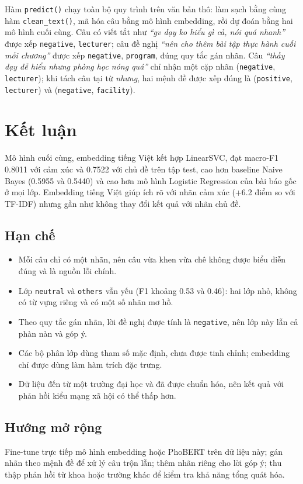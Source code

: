 Hàm \texttt{predict()} chạy toàn bộ quy trình trên văn bản thô: làm sạch bằng cùng hàm \texttt{clean\_text()}, mã hóa câu
bằng mô hình embedding, rồi dự đoán bằng hai mô hình cuối cùng. Câu có viết tắt như \textit{``gv dạy ko hiểu gì cả, nói
quá nhanh''} được xếp \texttt{negative}, \texttt{lecturer}; câu đề nghị \textit{``nên cho thêm bài tập thực hành cuối mỗi
chương''} được xếp \texttt{negative}, \texttt{program}, đúng quy tắc gán nhãn. Câu \textit{``thầy dạy dễ hiểu nhưng phòng
học nóng quá''} chỉ nhận một cặp nhãn (\texttt{negative}, \texttt{lecturer}); khi tách câu tại từ \textit{nhưng}, hai
mệnh đề được xếp đúng là (\texttt{positive}, \texttt{lecturer}) và (\texttt{negative}, \texttt{facility}).

\section{Kết luận}

Mô hình cuối cùng, embedding tiếng Việt kết hợp LinearSVC, đạt macro-F1 0.8011 với cảm xúc và 0.7522 với chủ đề trên tập
test, cao hơn baseline Naive Bayes (0.5955 và 0.5440) và cao hơn mô hình Logistic Regression của bài báo gốc ở mọi lớp.
Embedding tiếng Việt giúp ích rõ với nhãn cảm xúc (+6.2 điểm so với TF-IDF) nhưng gần như không thay đổi kết quả với nhãn
chủ đề.

\subsection*{Hạn chế}
\begin{itemize}
  \item Mỗi câu chỉ có một nhãn, nên câu vừa khen vừa chê không được biểu diễn đúng và là nguồn lỗi chính.
  \item Lớp \texttt{neutral} và \texttt{others} vẫn yếu (F1 khoảng 0.53 và 0.46): hai lớp nhỏ, không có từ vựng riêng và
        có một số nhãn mơ hồ.
  \item Theo quy tắc gán nhãn, lời đề nghị được tính là \texttt{negative}, nên lớp này lẫn cả phàn nàn và góp ý.
  \item Các bộ phân lớp dùng tham số mặc định, chưa được tinh chỉnh; embedding chỉ được dùng làm hàm trích đặc trưng.
  \item Dữ liệu đến từ một trường đại học và đã được chuẩn hóa, nên kết quả với phản hồi kiểu mạng xã hội có thể thấp hơn.
\end{itemize}

\subsection*{Hướng mở rộng}
Fine-tune trực tiếp mô hình embedding hoặc PhoBERT trên dữ liệu này; gán nhãn theo mệnh đề để xử
lý câu trộn lẫn; thêm nhãn riêng cho lời góp ý; thu thập phản hồi từ khoa hoặc trường khác để kiểm tra khả năng tổng
quát hóa.

